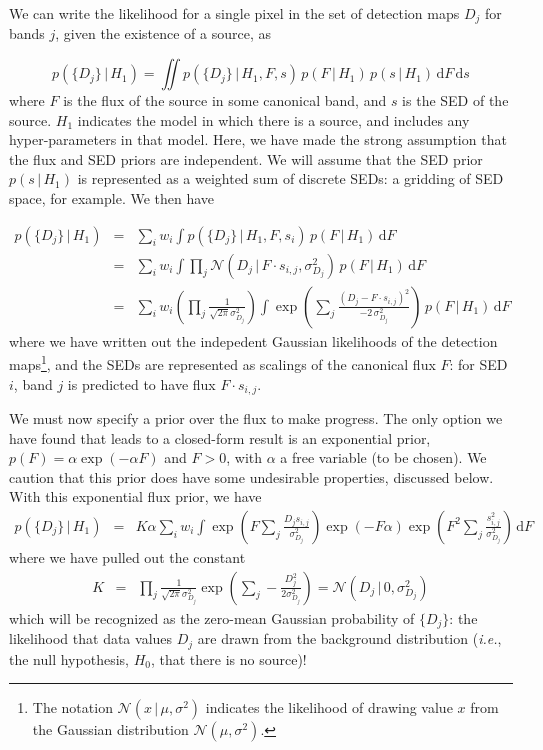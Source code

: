 \documentclass[11pt,letterpaper,linenumbers]{aastex7}
\newcommand{\latin}[1]{\emph{#1}}
\newcommand{\ie}{\latin{i.e.}}
\newcommand{\gaussianN}{\mathcal{N}}
\newcommand{\gaussian}[1]{\gaussianN\!\left(#1\right)}
\newcommand{\dd}{\mathrm{d}}
\newcommand{\fg}{\ensuremath{H_1}}
\newcommand{\bg}{\ensuremath{H_0}}
\newcommand{\given}{\,\vert\,}
\newcommand{\changed}[1]{#1}
\begin{document}
We can write the likelihood for a single pixel in the set of detection
maps $D_j$ for bands $j$, given the existence of a source, as
\changed{
\begin{equation}
  p(\{ D_j \} \given \fg) = \iint p(\{ D_j \} \given \fg, F, s) \, p(F \given \fg) \,
  p(s \given \fg) \, \dd F \, \dd s
  \label{eq:margsed}
\end{equation}
where $F$ is the flux of the source in some canonical band, and $s$ is
the SED of the source.  $\fg$ indicates the model in which there is a source, and includes
any hyper-parameters in that model.  Here, we have made the strong assumption that the
flux and SED priors are independent.  We will assume that the SED prior $p(s \given \fg)$ is
represented as a weighted sum of discrete SEDs: a gridding of SED
space, for example.  We then have
}
\begin{eqnarray}
  p(\{ D_j \} \given \fg)
  &=&
  \sum_{i} w_i \int p(\{ D_j \} \given \fg, F, s_i) \, p(F \given \fg) \, \dd F
  \\
  &=&
  \sum_i w_i \int \prod_j \gaussian{D_j \given F \cdot s_{i,j}, \sigma_{D_j}^2} \, p(F \given \fg) \, \dd F
  \\
  &=&
  \sum_i w_i 
  \left( \prod_j \frac{1}{\sqrt{2 \pi} \sigma_{D_j}^2} \right)
  \int 
    \exp{ \left( \sum_j \frac{(D_j - F \cdot s_{i,j})^2}{-2 \, \sigma_{D_j}^2} \right) }
    \, p(F \given \fg) \, \dd F
\end{eqnarray}
%
where we have written out the indepedent Gaussian likelihoods of the
detection maps\footnote{The notation $\gaussian{x \given \mu, \sigma^2}$ indicates the likelihood
  of drawing value $x$ from the Gaussian distribution $\gaussian{\mu, \sigma^2}$.},
and the SEDs are represented as scalings of the
canonical flux $F$: for SED $i$, band $j$ is predicted to have flux $F
\cdot s_{i,j}$.

We must now specify a prior over the flux to make progress.  The only
option we have found that leads to a closed-form result is an exponential prior,
$p(F) = \alpha \exp(-\alpha F)$ and $F > 0$, with $\alpha$ a free
variable (to be chosen).  We caution that this prior does have some
undesirable properties, discussed below.  With this exponential flux
prior, we have
\begin{eqnarray}
  p(\{ D_j \} \given \fg)
  &=&
  K \alpha
  \sum_i w_i 
  \int 
    \exp{ \left( F \sum_j \frac{D_j s_{i,j}}{\sigma_{D_j}^2} \right)}
    \exp{ \left( -F \alpha \right)}
    \exp{ \left( F^2 \sum_j \frac{s_{i,j}^2}{\sigma_{D_j}^2} \right)}
    \, \dd F
\end{eqnarray}
where we have pulled out the constant
\begin{eqnarray}
K &=& \prod_j \frac{1}{\sqrt{2 \pi} \sigma_{D_j}^2} 
\exp{\left( \sum_j -\frac{D_j^2}{2 \sigma_{D_j}^2} \right)}
= \gaussian{D_j \,|\, 0, \sigma_{D_j}^2}
\label{eq:pbg}
\end{eqnarray}
which will be recognized as the zero-mean Gaussian probability of
$\{D_j\}$: the likelihood that data values $D_j$ are drawn from the
background distribution (\ie, the null hypothesis, $\bg$, that there is no
source)!
\end{document}

